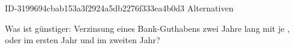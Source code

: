 \begin{exercise}
      {ID-3199694cbab153a3f2924a5db2276f333ea4b0d3}
      {Alternativen}
  \ifproblem\problem\par
    Was ist günstiger: Verzinsung eines Bank-Guthabens zwei Jahre lang mit
    je , oder  im ersten Jahr und  im zweiten Jahr?
  \fi
\end{exercise}
